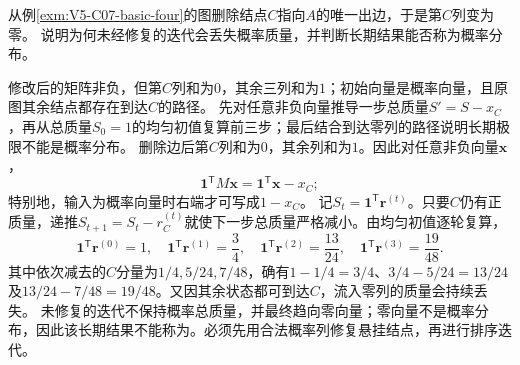 \begin{example}[删除一条边后的概率质量流失]\label{exm:V5-C07-dangling-loss}
从例\ref{exm:V5-C07-basic-four}的图删除结点$C$指向$A$的唯一出边，于是第$C$列变为零。
说明为何未经修复的迭代会丢失概率质量，并判断长期结果能否称为\PageRank{}概率分布。
\end{example}
\begin{solution}
\SolGiven 修改后的矩阵非负，但第$C$列和为$0$，其余三列和为$1$；初始向量是概率向量，且原图其余结点都存在到达$C$的路径。
\SolPlan 先对任意非负向量推导一步总质量$S'=S-x_C$，再从总质量$S_0=1$的均匀初值复算前三步；最后结合到达零列的路径说明长期极限不能是概率分布。
\SolDerive 删除边后第$C$列和为$0$，其余列和为$1$。因此对任意非负向量$\boldsymbol x$，
\[
\boldsymbol1^{\mathsf T}M\boldsymbol x
=\boldsymbol1^{\mathsf T}\boldsymbol x-x_C;
\]
特别地，输入为概率向量时右端才可写成$1-x_C$。
\SolCheck 记$S_t=\boldsymbol1^{\mathsf T}\boldsymbol r^{(t)}$。只要$C$仍有正质量，递推$S_{t+1}=S_t-r_C^{(t)}$就使下一步总质量严格减小。由均匀初值逐轮复算，
\[
\boldsymbol1^{\mathsf T}\boldsymbol r^{(0)}=1,\quad
\boldsymbol1^{\mathsf T}\boldsymbol r^{(1)}=\frac34,\quad
\boldsymbol1^{\mathsf T}\boldsymbol r^{(2)}=\frac{13}{24},\quad
\boldsymbol1^{\mathsf T}\boldsymbol r^{(3)}=\frac{19}{48}.
\]
其中依次减去的$C$分量为$1/4,5/24,7/48$，确有$1-1/4=3/4$、$3/4-5/24=13/24$及$13/24-7/48=19/48$。又因其余状态都可到达$C$，流入零列的质量会持续丢失。
\SolAnswer 未修复的迭代不保持概率总质量，并最终趋向零向量；零向量不是概率分布，因此该长期结果不能称为\PageRank{}。必须先用合法概率列修复悬挂结点，再进行排序迭代。
\end{solution}

